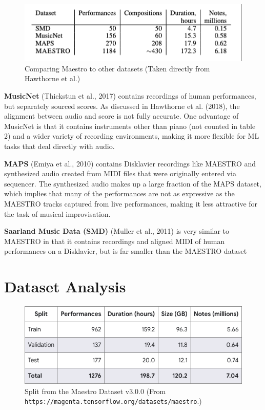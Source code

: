 \documentclass[../main.tex]{subfiles}
\begin{document}
\begin{figure}[hp]
    \centering
    \includegraphics[width=1\textwidth]{imgs/maestro_comparison.png}
    \caption{Comparing Maestro to other datasets (Taken directly from Hawthorne et al.)}
    \label{table:maestro_comparison}
\end{figure}

\textbf{MusicNet} (Thickstun et al., 2017) contains recordings of human performances, but separately sourced scores. As discussed in Hawthorne et al. (2018), the alignment between audio and score is not fully accurate. One advantage of MusicNet is that it contains instruments other than piano (not counted in table 2) and a wider variety of recording environments, making it more flexible for ML tasks that deal directly with audio. 

\textbf{MAPS} (Emiya et al., 2010) contains Disklavier recordings like MAESTRO and synthesized audio created from MIDI files that were originally entered via sequencer. The synthesized audio makes up a large fraction of the MAPS dataset, which implies that many of the performances are not as expressive as the MAESTRO tracks captured from live performances, making it less attractive for the task of musical improvisation.

\textbf{Saarland Music Data (SMD)} (Muller et al., 2011) is very similar to MAESTRO in that it contains recordings and aligned MIDI of human performances on a Disklavier, but is far smaller than the MAESTRO dataset

\section{Dataset Analysis}

\begin{figure}[hp]
    \centering
    \includegraphics[width=1\textwidth]{imgs/maestro_split.png}
    \caption{Split from the Maestro Dataset v3.0.0 (From \nolinkurl{https://magenta.tensorflow.org/datasets/maestro}.)}
    \label{table:maestro_split}
\end{figure}
\end{document}
